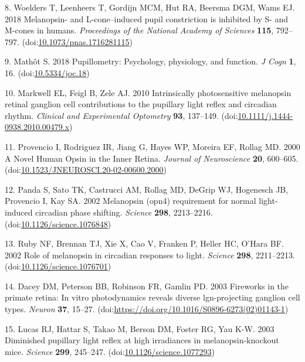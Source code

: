 \documentclass[
]{article}
\begin{document}
\leavevmode\hypertarget{ref-Woelders2018}{}%
8. Woelders T, Leenheers T, Gordijn MCM, Hut RA, Beersma DGM, Wams EJ. 2018 Melanopsin- and L-cone--induced pupil constriction is inhibited by S- and M-cones in humans. \emph{Proceedings of the National Academy of Sciences} \textbf{115}, 792--797. (doi:\href{https://doi.org/10.1073/pnas.1716281115}{10.1073/pnas.1716281115})

\leavevmode\hypertarget{ref-Mathot2018}{}%
9. Mathôt S. 2018 Pupillometry: Psychology, physiology, and function. \emph{J Cogn} \textbf{1}, 16. (doi:\href{https://doi.org/10.5334/joc.18}{10.5334/joc.18})

\leavevmode\hypertarget{ref-Markwell2010}{}%
10. Markwell EL, Feigl B, Zele AJ. 2010 Intrinsically photosensitive melanopsin retinal ganglion cell contributions to the pupillary light reflex and circadian rhythm. \emph{Clinical and Experimental Optometry} \textbf{93}, 137--149. (doi:\href{https://doi.org/10.1111/j.1444-0938.2010.00479.x}{10.1111/j.1444-0938.2010.00479.x})

\leavevmode\hypertarget{ref-Provencio2000}{}%
11. Provencio I, Rodriguez IR, Jiang G, Hayes WP, Moreira EF, Rollag MD. 2000 A Novel Human Opsin in the Inner Retina. \emph{Journal of Neuroscience} \textbf{20}, 600--605. (doi:\href{https://doi.org/10.1523/JNEUROSCI.20-02-00600.2000}{10.1523/JNEUROSCI.20-02-00600.2000})

\leavevmode\hypertarget{ref-Panda2002}{}%
12. Panda S, Sato TK, Castrucci AM, Rollag MD, DeGrip WJ, Hogenesch JB, Provencio I, Kay SA. 2002 Melanopsin (opn4) requirement for normal light-induced circadian phase shifting. \emph{Science} \textbf{298}, 2213--2216. (doi:\href{https://doi.org/10.1126/science.1076848}{10.1126/science.1076848})

\leavevmode\hypertarget{ref-Ruby2002}{}%
13. Ruby NF, Brennan TJ, Xie X, Cao V, Franken P, Heller HC, O'Hara BF. 2002 Role of melanopsin in circadian responses to light. \emph{Science} \textbf{298}, 2211--2213. (doi:\href{https://doi.org/10.1126/science.1076701}{10.1126/science.1076701})

\leavevmode\hypertarget{ref-Dacey2003}{}%
14. Dacey DM, Peterson BB, Robinson FR, Gamlin PD. 2003 Fireworks in the primate retina: In vitro photodynamics reveals diverse lgn-projecting ganglion cell types. \emph{Neuron} \textbf{37}, 15--27. (doi:\href{https://doi.org/https://doi.org/10.1016/S0896-6273(02)01143-1}{https://doi.org/10.1016/S0896-6273(02)01143-1})

\leavevmode\hypertarget{ref-Lucas2003}{}%
15. Lucas RJ, Hattar S, Takao M, Berson DM, Foster RG, Yau K-W. 2003 Diminished pupillary light reflex at high irradiances in melanopsin-knockout mice. \emph{Science} \textbf{299}, 245--247. (doi:\href{https://doi.org/10.1126/science.1077293}{10.1126/science.1077293})
\end{document}
